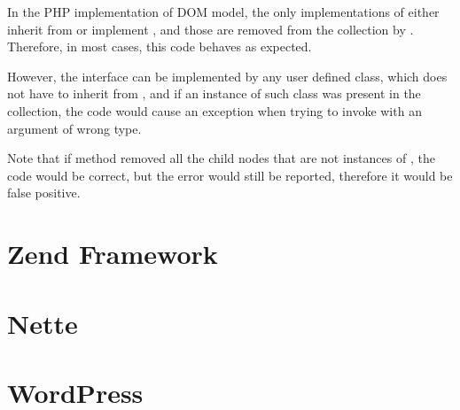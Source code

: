In the PHP implementation of DOM model, the only implementations of 
 either inherit from  or 
implement , and those are removed 
from the  collection by . 
Therefore, in most cases, this code behaves as expected. 

However, the  interface can be implemented by any user 
defined class, which does not have to inherit from 
, and if an instance of such class was present 
in the  collection, the code would cause an 
exception when trying to invoke  
with an argument of wrong type.

Note that if method  removed 
all the child nodes that are not instances of , 
the code would be correct, but the error would still be reported, 
therefore it would be false positive.


\section{Zend Framework}

\section{Nette}

\section{WordPress}


